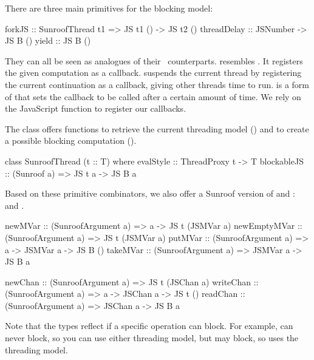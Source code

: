 There are three main primitives for the blocking model:
\begin{Code}
forkJS      :: SunroofThread t1 => JS t1 () -> JS t2 ()
threadDelay :: JSNumber -> JS B ()
yield       :: JS B ()
\end{Code}
They can all be seen as analogues of their \IO~counterparts.
 resembles .
It registers the given computation as a callback. 
 suspends the current thread by 
registering the current continuation as a callback,
giving other threads time to run.
 is a form of  that sets 
the callback to be called after a certain amount of time.
We rely on the JavaScript function  
\cite{whatwg:timers} to register our callbacks.

The class  offers functions to retrieve the 
current threading model () and to create a possible
blocking computation ().
\begin{Code}
class SunroofThread (t :: T) where
  evalStyle   :: ThreadProxy t -> T
  blockableJS :: (Sunroof a) => JS t a -> JS B a
\end{Code}
Based on these primitive combinators, we also offer a Sunroof 
version of  and :  and .
\begin{Code}
newMVar      :: (SunroofArgument a) => a -> JS t (JSMVar a)
newEmptyMVar :: (SunroofArgument a) => JS t (JSMVar a)
putMVar      :: (SunroofArgument a) => a -> JSMVar a -> JS B ()
takeMVar     :: (SunroofArgument a) => JSMVar a -> JS B a

newChan   :: (SunroofArgument a) => JS t (JSChan a)
writeChan :: (SunroofArgument a) => a -> JSChan a -> JS t ()
readChan  :: (SunroofArgument a) => JSChan a -> JS B a
\end{Code}
Note that the types reflect if a specific operation can block.
For example,  can never block, so you can use either threading model,
but  may block, so uses the  threading model.


